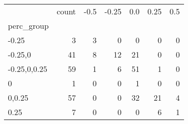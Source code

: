 \begin{tabular}{lrrrrrr}
\toprule
{} &  count &  -0.5 &  -0.25 &  0.0 &  0.25 &  0.5 \\
perc\_group   &        &       &        &      &       &      \\
\midrule
-0.25        &      3 &     3 &      0 &    0 &     0 &    0 \\
-0.25,0      &     41 &     8 &     12 &   21 &     0 &    0 \\
-0.25,0,0.25 &     59 &     1 &      6 &   51 &     1 &    0 \\
0            &      1 &     0 &      0 &    1 &     0 &    0 \\
0,0.25       &     57 &     0 &      0 &   32 &    21 &    4 \\
0.25         &      7 &     0 &      0 &    0 &     6 &    1 \\
\bottomrule
\end{tabular}
